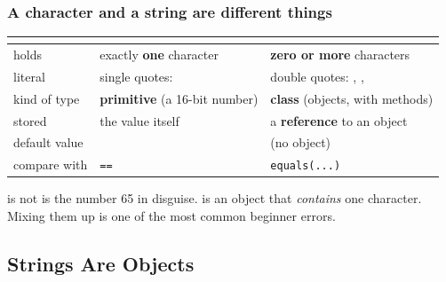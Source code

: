 \documentclass[aspectratio=169,10pt,compress]{beamer}
\begin{document}
\begin{frame}[t,fragile] \frametitle{A character and a string are different things}
  \small
  \begin{tabular}{@{}L{0.22\textwidth}L{0.33\textwidth}L{0.36\textwidth}@{}}
    \toprule
                       & \textbf{}                  & \textbf{} \\
    \midrule
    holds              & exactly \textbf{one} character           & \textbf{zero or more} characters \\
    literal            & single quotes:               & double quotes: , ,  \\
    kind of type       & \textbf{primitive} (a 16-bit number)     & \textbf{class} (objects, with methods) \\
    stored             & the value itself                          & a \textbf{reference} to an object \\
    default value      &           &  (no object) \\
    compare with       & \texttt{==}                               & \texttt{equals(...)} \\
    \bottomrule
  \end{tabular}

  \vspace{0.8em}
	\begin{alertblock}
		{ is not }
		 is the number 65 in disguise. 
		 is an object that \emph{contains} one character.
		Mixing them up is one of the most common beginner errors.
	\end{alertblock}
\end{frame}

\subsection[Objects]{Strings Are Objects}

\end{document}
